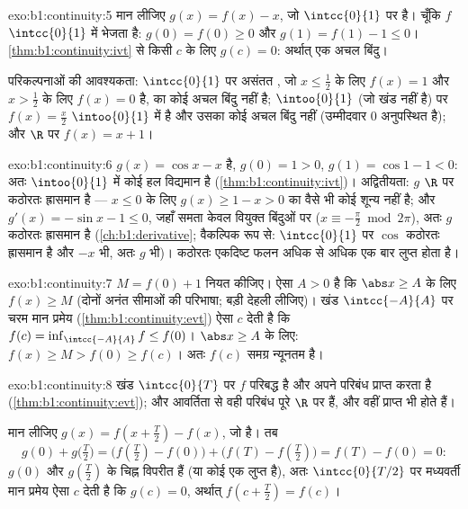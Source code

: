 \begin{solution}{exo:b1:continuity:5}
मान लीजिए $g(x) = f(x) - x$, जो $\intcc{0}{1}$ पर  है। चूँकि $f$
$\intcc{0}{1}$ में भेजता है: $g(0) = f(0) \geq 0$ और $g(1) = f(1) - 1 \leq
0$। \cref{thm:b1:continuity:ivt} से किसी $c$ के लिए $g(c) = 0$: अर्थात् एक
अचल बिंदु।

परिकल्पनाओं की आवश्यकता: $\intcc{0}{1}$ पर असंतत , जो $x \leq
\frac12$ के लिए $f(x) = 1$ और $x > \frac12$ के लिए $f(x) = 0$ है, का कोई अचल
बिंदु नहीं है;  $\intoo{0}{1}$ (जो खंड नहीं है) पर $f(x) = \frac x2$
$\intoo{0}{1}$ में  है और उसका कोई अचल बिंदु नहीं (उम्मीदवार $0$
अनुपस्थित है); और $\R$ पर $f(x) = x + 1$।
\end{solution}

\begin{solution}{exo:b1:continuity:6}
$g(x) = \cos x - x$  है, $g(0) = 1 > 0$, $g(1) = \cos 1 - 1 < 0$: अतः
$\intoo{0}{1}$ में कोई हल विद्यमान है (\cref{thm:b1:continuity:ivt})।
अद्वितीयता: $g$ $\R$ पर कठोरतः ह्रासमान है --- $x \leq 0$ के लिए $g(x) \geq
1 - x > 0$ का वैसे भी कोई शून्य नहीं है; और $g'(x) = -\sin x - 1 \leq 0$,
जहाँ समता केवल वियुक्त बिंदुओं पर ($x \equiv -\frac\pi2 \bmod 2\pi$), अतः
$g$ कठोरतः ह्रासमान है (\cref{ch:b1:derivative}; वैकल्पिक रूप से:
$\intcc{0}{1}$ पर $\cos$ कठोरतः ह्रासमान है और $-x$ भी, अतः $g$ भी)। कठोरतः
एकदिष्ट फलन अधिक से अधिक एक बार लुप्त होता है।
\end{solution}

\begin{solution}{exo:b1:continuity:7}
$M = f(0) + 1$ नियत कीजिए। ऐसा $A > 0$ है कि $\abs x \geq A$ के लिए $f(x)
\geq M$ (दोनों अनंत सीमाओं की परिभाषा; बड़ी देहली लीजिए)। खंड
$\intcc{-A}{A}$ पर चरम मान प्रमेय (\cref{thm:b1:continuity:evt}) ऐसा $c$
देती है कि $f(c) = \inf_{\intcc{-A}{A}} f \leq f(0)$। $\abs x \geq A$ के
लिए: $f(x) \geq M > f(0) \geq f(c)$। अतः $f(c)$ समग्र न्यूनतम है।
\end{solution}

\begin{solution}{exo:b1:continuity:8}
खंड $\intcc{0}{T}$ पर $f$ परिबद्ध है और अपने परिबंध प्राप्त करता है
(\cref{thm:b1:continuity:evt}); और आवर्तिता से वही परिबंध पूरे $\R$ पर हैं,
और वहीं प्राप्त भी होते हैं।

मान लीजिए $g(x) = f(x + \frac T2) - f(x)$, जो  है। तब
\[
g(0) + g\bigl(\tfrac T2\bigr)
= \bigl(f(\tfrac T2) - f(0)\bigr) + \bigl(f(T) - f(\tfrac T2)\bigr)
= f(T) - f(0) = 0 :
\]
$g(0)$ और $g(\frac T2)$ के चिह्न विपरीत हैं (या कोई एक लुप्त है), अतः
$\intcc{0}{T/2}$ पर मध्यवर्ती मान प्रमेय ऐसा $c$ देती है कि $g(c) = 0$,
अर्थात् $f(c + \frac T2) = f(c)$।
\end{solution}

